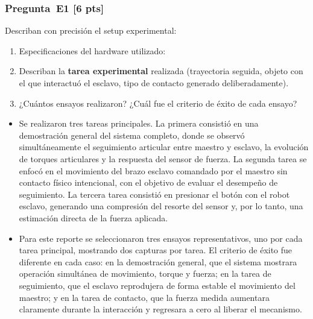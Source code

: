 \documentclass[journal,10pt,twoside]{IEEEtran}
\newcommand{\pts}[1]{\textbf{\color{tec_red}[#1 pts]}}
\begin{document}
\subsubsection*{Pregunta~E1 \pts{6}}
Describan con precisión el setup experimental:
\begin{enumerate}[label=(\alph*)]
  \item Especificaciones del hardware utilizado:
  \begin{center}
  \scriptsize
  \end{center}

  
  \item Describan la \textbf{tarea experimental} realizada
        (trayectoria seguida, objeto con el que interactuó el esclavo,
        tipo de contacto generado deliberadamente).
  \item ¿Cuántos ensayos realizaron? ¿Cuál fue el criterio de éxito
        de cada ensayo?
\end{enumerate}

\begin{itemize}
    \item Se realizaron tres tareas principales. La primera consistió en una demostración general del sistema completo, donde se observó simultáneamente el seguimiento articular entre maestro y esclavo, la evolución de torques articulares y la respuesta del sensor de fuerza. La segunda tarea se enfocó en el movimiento del brazo esclavo comandado por el maestro sin contacto físico intencional, con el objetivo de evaluar el desempeño de seguimiento. La tercera tarea consistió en presionar el botón con el robot esclavo, generando una compresión del resorte del sensor y, por lo tanto, una estimación directa de la fuerza aplicada.
    \\
    
    \item Para este reporte se seleccionaron tres ensayos representativos, uno por cada tarea principal, mostrando dos capturas por tarea. El criterio de éxito fue diferente en cada caso: en la demostración general, que el sistema mostrara operación simultánea de movimiento, torque y fuerza; en la tarea de seguimiento, que el esclavo reprodujera de forma estable el movimiento del maestro; y en la tarea de contacto, que la fuerza medida aumentara claramente durante la interacción y regresara a cero al liberar el mecanismo.
\end{itemize}
\end{document}
